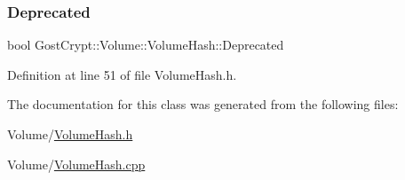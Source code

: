 \subsubsection{\texorpdfstring{Deprecated}{Deprecated}}
{\footnotesize\ttfamily bool Gost\+Crypt\+::\+Volume\+::\+Volume\+Hash\+::\+Deprecated\hspace{0.3cm}{\ttfamily [protected]}}



Definition at line 51 of file Volume\+Hash.\+h.



The documentation for this class was generated from the following files\+:\begin{DoxyCompactItemize}
\item 
Volume/\hyperlink{_volume_hash_8h}{Volume\+Hash.\+h}\item 
Volume/\hyperlink{_volume_hash_8cpp}{Volume\+Hash.\+cpp}\end{DoxyCompactItemize}

